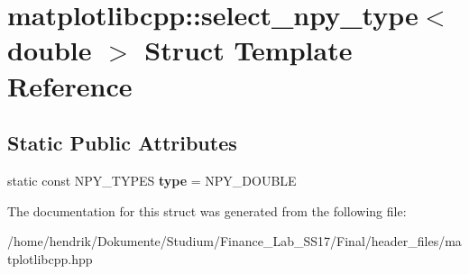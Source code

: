 \hypertarget{structmatplotlibcpp_1_1select__npy__type_3_01double_01_4}{}\section{matplotlibcpp\+:\+:select\+\_\+npy\+\_\+type$<$ double $>$ Struct Template Reference}
\label{structmatplotlibcpp_1_1select__npy__type_3_01double_01_4}
\subsection*{Static Public Attributes}
\begin{DoxyCompactItemize}
\item 
static const N\+P\+Y\+\_\+\+T\+Y\+P\+ES {\bfseries type} = N\+P\+Y\+\_\+\+D\+O\+U\+B\+LE\hypertarget{structmatplotlibcpp_1_1select__npy__type_3_01double_01_4_a939edaf81fedb879c8c90ad13c98a709}{}\label{structmatplotlibcpp_1_1select__npy__type_3_01double_01_4_a939edaf81fedb879c8c90ad13c98a709}

\end{DoxyCompactItemize}


The documentation for this struct was generated from the following file\+:\begin{DoxyCompactItemize}
\item 
/home/hendrik/\+Dokumente/\+Studium/\+Finance\+\_\+\+Lab\+\_\+\+S\+S17/\+Final/header\+\_\+files/matplotlibcpp.\+hpp\end{DoxyCompactItemize}
